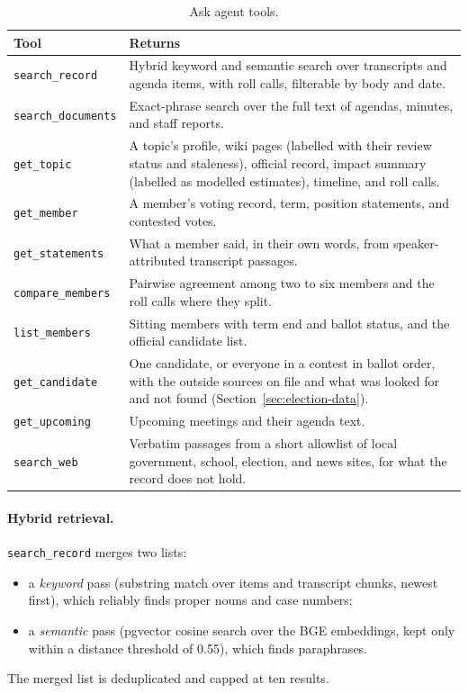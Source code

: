 \documentclass[11pt]{article}
\newcommand{\code}[1]{\texttt{#1}}
\begin{document}
\begin{table}[h]
\centering\small
\begin{tabularx}{\linewidth}{@{}lL@{}}
\toprule
Tool & Returns \\
\midrule
\code{search\_record} & Hybrid keyword and semantic search over transcripts and agenda items, with roll calls, filterable by body and date. \\
\code{search\_documents} & Exact-phrase search over the full text of agendas, minutes, and staff reports. \\
\code{get\_topic} & A topic's profile, wiki pages (labelled with their review status and staleness), official record, impact summary (labelled as modelled estimates), timeline, and roll calls. \\
\code{get\_member} & A member's voting record, term, position statements, and contested votes. \\
\code{get\_statements} & What a member said, in their own words, from speaker-attributed transcript passages. \\
\code{compare\_members} & Pairwise agreement among two to six members and the roll calls where they split. \\
\code{list\_members} & Sitting members with term end and ballot status, and the official candidate list. \\
\code{get\_candidate} & One candidate, or everyone in a contest in ballot order, with the outside sources on file and what was looked for and not found (Section~\ref{sec:election-data}). \\
\code{get\_upcoming} & Upcoming meetings and their agenda text. \\
\code{search\_web} & Verbatim passages from a short allowlist of local government, school, election, and news sites, for what the record does not hold. \\
\bottomrule
\end{tabularx}
\caption{Ask agent tools.}
\end{table}

\paragraph{Hybrid retrieval.} \code{search\_record} merges two lists:
\begin{itemize}
  \item a \emph{keyword} pass (substring match over items and transcript chunks, newest
        first), which reliably finds proper nouns and case numbers;
  \item a \emph{semantic} pass (pgvector cosine search over the BGE embeddings, kept only
        within a distance threshold of 0.55), which finds paraphrases.
\end{itemize}
The merged list is deduplicated and capped at ten results.
\end{document}
